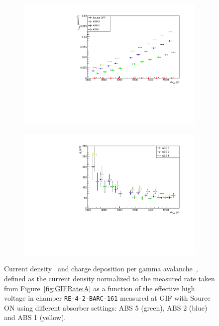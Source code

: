 	\begin{figure}[H]
    	\begin{subfigure}{0.5\linewidth}
			\centering
    		\includegraphics[width = 0.7\plotwidth]{fig/chapt5/Current-Density.pdf}
        	\caption{\label{fig:Charge:A}}
    	\end{subfigure}
    	\begin{subfigure}{0.5\linewidth}
			\centering
    		\includegraphics[width = 0.7\plotwidth]{fig/chapt5/Charge-per-gamma.pdf}
        	\caption{\label{fig:Charge:B}}
    	\end{subfigure}
		\caption{\label{fig:Charge} Current density~ and charge deposition per gamma avalanche~, defined as the current density normalized to the measured rate taken from Figure~\ref{fig:GIFRate:A} as a function of the effective high voltage in chamber \texttt{RE-4-2-BARC-161} measured at GIF with Source ON using different absorber settings: ABS 5 (green), ABS 2 (blue) and ABS 1 (yellow).}
	\end{figure}
	
